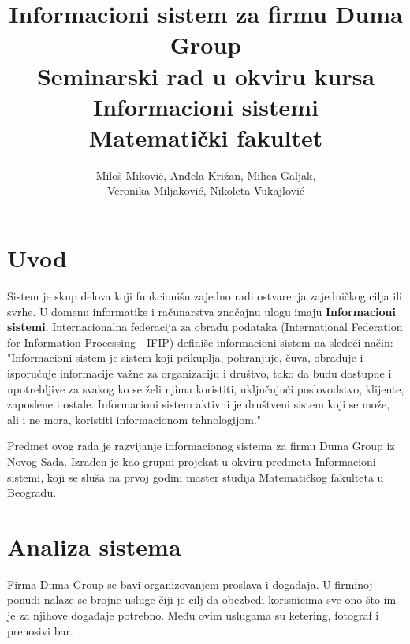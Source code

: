 \documentclass[a4paper]{article}
\begin{document}
\title{Informacioni sistem za firmu Duma Group\\ \small{Seminarski rad u okviru kursa\\Informacioni sistemi\\ Matematički fakultet}}

\author{Miloš Miković, Anđela Križan, Milica Galjak, \\ Veronika Miljaković, Nikoleta Vukajlović}


\maketitle

\abstract{
}

\tableofcontents

\newpage

\section{Uvod}

 Sistem je skup delova koji funkcionišu zajedno radi ostvarenja zajedničkog cilja ili svrhe. U domenu informatike i računarstva značajnu ulogu imaju \textbf{Informacioni sistemi}. Internacionalna federacija za obradu podataka (International Federation for Information Processing - IFIP) definiše informacioni sistem na sledeći način: "Informacioni sistem je sistem koji prikuplja, pohranjuje, čuva, obrađuje i isporučuje informacije važne za organizaciju i društvo, tako da budu dostupne i upotrebljive za svakog ko se želi njima koristiti, uključujući poslovodstvo, klijente, zaposlene i ostale. Informacioni sistem aktivni je društveni sistem koji se može, ali i ne mora, koristiti      informacionom tehnologijom." 
    
 Predmet ovog rada je razvijanje informacionog sistema za firmu Duma Group iz Novog Sada. Izrađen je kao grupni projekat u okviru predmeta Informacioni sistemi, koji se sluša na prvoj godini master studija Matematičkog fakulteta u Beogradu.

\section{Analiza sistema}

Firma Duma Group se bavi organizovanjem proslava i događaja. U firminoj ponudi nalaze se brojne usluge čiji je cilj da obezbedi korisnicima sve ono što im je za njihove događaje potrebno. Među ovim uslugama su ketering, fotograf i prenosivi bar.
\end{document}
